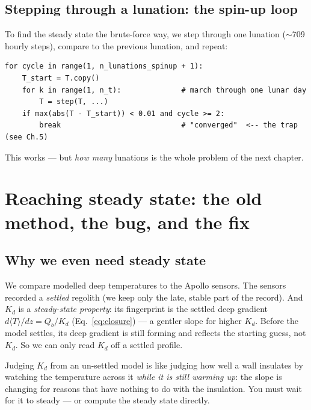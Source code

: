 \documentclass[11pt]{report}
\newcommand{\Tm}{\langle T\rangle}
\begin{document}
\section{Stepping through a lunation: the spin-up loop}
To find the steady state the brute-force way, we step through one lunation
($\sim$709 hourly steps), compare to the previous lunation, and repeat:
\begin{lstlisting}[style=py]
for cycle in range(1, n_lunations_spinup + 1):
    T_start = T.copy()
    for k in range(1, n_t):              # march through one lunar day
        T = step(T, ...)
    if max(abs(T - T_start)) < 0.01 and cycle >= 2:
        break                            # "converged"  <-- the trap (see Ch.5)
\end{lstlisting}
This works --- but \emph{how many} lunations is the whole problem of the next
chapter.

\chapter{Reaching steady state: the old method, the bug, and the fix}\label{ch:steady}

\section{Why we even need steady state}\label{sec:whyss}
We compare modelled deep temperatures to the Apollo sensors. The sensors recorded
a \emph{settled} regolith (we keep only the late, stable part of the record). And
$K_d$ is a \emph{steady-state property}: its fingerprint is the settled deep
gradient $d\Tm/dz=Q_b/K_d$ (Eq.~\eqref{eq:closure}) --- a gentler slope for higher
$K_d$. Before the model settles, its deep gradient is still forming and reflects
the starting guess, not $K_d$. So we can only read $K_d$ off a settled profile.

\begin{plain}
Judging $K_d$ from an un-settled model is like judging how well a wall insulates
by watching the temperature across it \emph{while it is still warming up}: the
slope is changing for reasons that have nothing to do with the insulation. You
must wait for it to steady --- or compute the steady state directly.
\end{plain}
\end{document}
